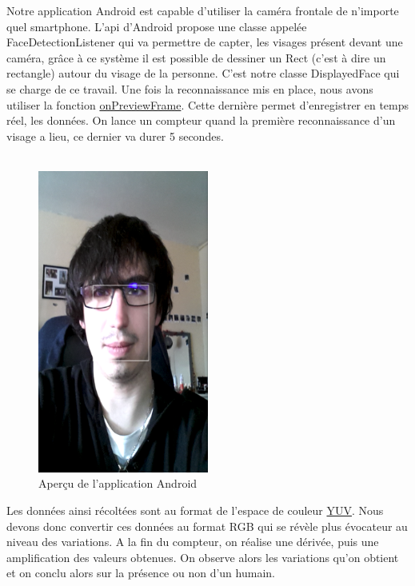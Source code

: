 	Notre application Android est capable d'utiliser la caméra frontale de n'importe quel smartphone. L'api d'Android propose une classe appelée FaceDetectionListener qui va permettre de capter, les visages présent 
	devant une caméra, grâce à ce système il est possible de dessiner un Rect (c'est à dire un rectangle) autour du visage de la personne. C'est notre classe DisplayedFace qui se charge de ce travail. Une fois la 
	reconnaissance mis en place, nous avons utiliser la fonction \href{http://developer.android.com/reference/android/hardware/Camera.PreviewCallback.html#onPreviewFrame\%28byte\%5B\%5D,\%20android.hardware.Camera\%29}{onPreviewFrame}. Cette dernière permet d'enregistrer en temps réel, les données. On lance un compteur quand la première reconnaissance d'un visage a lieu, ce dernier va durer 5 secondes.\\
\\
\begin{figure}[h!]
			\centering
			\includegraphics[width=0.5\textwidth]{data/appAndroid.png}
			\caption{Aperçu de l'application Android}
		\end{figure}
	Les données ainsi récoltées sont au format de l'espace de couleur \href{http://fr.wikipedia.org/wiki/YUV}{YUV}. Nous devons donc convertir ces données au format RGB qui se révèle plus évocateur au niveau des variations. 
	A la fin du compteur, on réalise une dérivée, puis une amplification des valeurs obtenues. On observe alors les variations qu'on obtient et on conclu alors sur la présence ou non d'un humain.
